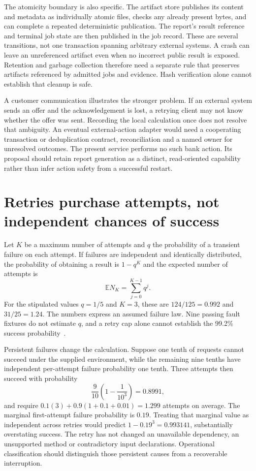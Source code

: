The atomicity boundary is also specific. The artifact store publishes its
content and metadata as individually atomic files, checks any already
present bytes, and can complete a repeated deterministic publication. The
report's result reference and terminal job state are then published in the
job record. These are several transitions, not one transaction spanning
arbitrary external systems. A crash can leave an unreferenced artifact even
when no incorrect public result is exposed. Retention and garbage collection
therefore need a separate rule that preserves artifacts referenced by admitted
jobs and evidence. Hash verification alone cannot establish that cleanup is
safe.

A customer communication illustrates the stronger problem. If an external
system sends an offer and the acknowledgement is lost, a retrying client may
not know whether the offer was sent. Recording the local calculation once
does not resolve that ambiguity. An eventual external-action adapter would
need a cooperating transaction or deduplication contract, reconciliation and
a named owner for unresolved outcomes. The present service performs no such
bank action. Its proposal should retain report generation as a distinct,
read-oriented capability rather than infer action safety from a successful
restart.

\section{Retries purchase attempts, not independent chances of success}

Let $K$ be a maximum number of attempts and $q$ the probability of a transient
failure on each attempt. If failures are independent and identically
distributed, the probability of obtaining a result is $1-q^K$ and the
expected number of attempts is
\[
 \mathbb E N_K=\sum_{j=0}^{K-1}q^j.
\]
For the stipulated values $q=1/5$ and $K=3$, these are $124/125=0.992$
and $31/25=1.24$. The numbers express an assumed failure law. Nine passing
fault fixtures do not estimate $q$, and a retry cap alone cannot establish
the 99.2\% success probability~\citep{exec13_ops_exact}.

Persistent failures change the calculation. Suppose one tenth of requests
cannot succeed under the supplied environment, while the remaining nine
tenths have independent per-attempt failure probability one tenth. Three
attempts then succeed with probability
\[
 \frac9{10}\left(1-\frac1{10^3}\right)=0.8991,
\]
and require $0.1(3)+0.9(1+0.1+0.01)=1.299$ attempts on average.
The marginal first-attempt failure probability is $0.19$. Treating that
marginal value as independent across retries would predict
$1-0.19^3=0.993141$, substantially overstating success. The retry has not
changed an unavailable dependency, an unsupported method or contradictory
input declarations. Operational classification should distinguish those
persistent causes from a recoverable interruption.

